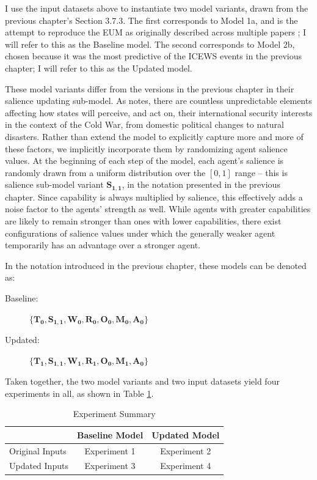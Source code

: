 I use the input datasets above to instantiate two model variants, drawn from the previous chapter's Section 3.7.3. The first corresponds to Model 1a, and is the attempt to reproduce the EUM as originally described across multiple papers \citep{bdm_1994,bdm_1997,bdm_2002}; I will refer to this as the Baseline model. The second corresponds to Model 2b, chosen because it was the most predictive of the ICEWS events in the previous chapter; I will refer to this as the Updated model.

These model variants differ from the versions in the previous chapter in their salience updating sub-model. As \citet{bdm_1998} notes, there are countless unpredictable elements affecting how states will perceive, and act on, their international security interests in the context of the Cold War, from domestic political changes to natural disasters. Rather than extend the model to explicitly capture more and more of these factors, we implicitly incorporate them by randomizing agent salience values. At the beginning of each step of the model, each agent's salience is randomly drawn from a uniform distribution over the ${[0, 1]}$ range -- this is salience sub-model variant $\mathbf{S_{1,1}}$, in the notation presented in the previous chapter. Since capability is always multiplied by salience, this effectively adds a noise factor to the agents' strength as well. While agents with greater capabilities are likely to remain stronger than ones with lower capabilities, there exist configurations of salience values under which the generally weaker agent temporarily has an advantage over a stronger agent.


In the notation introduced in the previous chapter, these models can be denoted as:

\begin{description}
  \item[Baseline:] $\{\mathbf{T_0, S_{1,1}, W_0, R_0, O_0, M_0, A_0}\}$ 
  \item[Updated:] $\{\mathbf{T_1, S_{1,1}, W_1, R_1, O_0, M_1, A_0}\}$
\end{description}

Taken together, the two model variants and two input datasets yield four experiments in all, as shown in Table \ref{table:experiment_matrix}.

\begin{table}
  \centering
  \caption{Experiment Summary}
    \label{table:experiment_matrix}
  \begin{tabular}{l|cc}
  \hline
                & Baseline Model &  Updated Model \\
  \hline
  Original Inputs & Experiment 1   & Experiment 2   \\
  Updated Inputs  & Experiment 3    & Experiment 4  \\
  \hline
\end{tabular}
    \tableSpace
\end{table}


